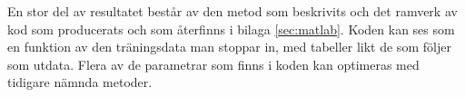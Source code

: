 \documentclass[../rapport_MVEX01-11-05]{subfiles}
\begin{document}
En stor del av resultatet består av den metod som beskrivits och
det ramverk av kod som producerats och som återfinns i bilaga \ref{sec:matlab}.
Koden kan ses som en funktion av den träningsdata man stoppar in,
med tabeller likt de som följer som utdata.
Flera av de parametrar som finns i koden kan optimeras
med tidigare nämnda metoder.
\end{document}
